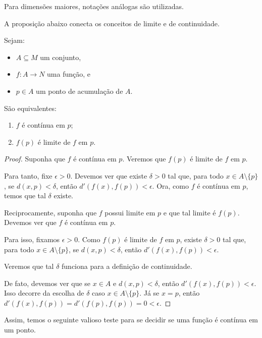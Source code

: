 Para dimensões maiores, notações análogas são utilizadas.
\smallskip

A proposição abaixo conecta os conceitos de limite e de continuidade.
\begin{proposition}
    Sejam:
    \begin{itemize}
        \item $A\subseteq M$ um conjunto,
        \item $f: A \to N$ uma função, e
        \item $p \in A$ um ponto de acumulação de $A$.
    \end{itemize}

    São equivalentes:
    \begin{enumerate}[label=(\roman*)]
        \item $f$ é contínua em $p$;
        \item $f(p)$ é limite de $f$ em $p$.
    \end{enumerate}
\end{proposition}

\begin{proof}
    Suponha que $f$ é contínua em $p$.
    Veremos que $f(p)$ é limite de $f$ em $p$.

    Para tanto, fixe $\epsilon>0$.
    Devemos ver que existe $\delta>0$ tal que, para todo $x \in A\setminus\{p\}$, se $d(x, p) < \delta$, então $d'(f(x), f(p)) < \epsilon$.
    Ora, como $f$ é contínua em $p$, temos que tal $\delta$ existe.
    \smallskip
    
    Reciprocamente, suponha que $f$ possui limite em $p$ e que tal limite é $f(p)$.
    Devemos ver que $f$ é contínua em $p$.

    Para isso, fixamos $\epsilon>0$.
    Como $f(p)$ é limite de $f$ em $p$, existe $\delta>0$ tal que, para todo $x \in A\setminus\{p\}$, se $d(x, p) < \delta$, então $d'(f(x), f(p)) < \epsilon$.

    Veremos que tal $\delta$ funciona para a definição de continuidade.

    De fato, devemos ver que se $x \in A$ e $d(x, p) < \delta$, então $d'(f(x), f(p)) < \epsilon$.
    Isso decorre da escolha de $\delta$ caso $x \in A\setminus\{p\}$.
    Já se $x = p$, então $d'(f(x), f(p)) = d'(f(p), f(p)) = 0 < \epsilon$.
\end{proof}

Assim, temos o seguinte valioso teste para se decidir se uma função é contínua em um ponto.

